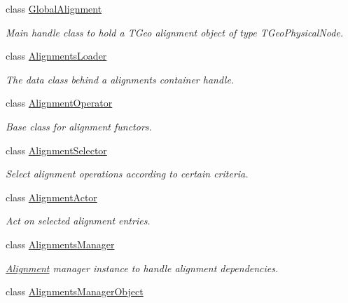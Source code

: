 \begin{DoxyCompactItemize}
class \hyperlink{class_d_d4hep_1_1_alignments_1_1_global_alignment}{GlobalAlignment}
\begin{DoxyCompactList}\small\item\em Main handle class to hold a TGeo alignment object of type TGeoPhysicalNode. \item\end{DoxyCompactList}\item 
class \hyperlink{class_d_d4hep_1_1_alignments_1_1_alignments_loader}{AlignmentsLoader}
\begin{DoxyCompactList}\small\item\em The data class behind a alignments container handle. \item\end{DoxyCompactList}\item 
class \hyperlink{class_d_d4hep_1_1_alignments_1_1_alignment_operator}{AlignmentOperator}
\begin{DoxyCompactList}\small\item\em Base class for alignment functors. \item\end{DoxyCompactList}\item 
class \hyperlink{class_d_d4hep_1_1_alignments_1_1_alignment_selector}{AlignmentSelector}
\begin{DoxyCompactList}\small\item\em Select alignment operations according to certain criteria. \item\end{DoxyCompactList}\item 
class \hyperlink{class_d_d4hep_1_1_alignments_1_1_alignment_actor}{AlignmentActor}
\begin{DoxyCompactList}\small\item\em Act on selected alignment entries. \item\end{DoxyCompactList}\item 
class \hyperlink{class_d_d4hep_1_1_alignments_1_1_alignments_manager}{AlignmentsManager}
\begin{DoxyCompactList}\small\item\em \hyperlink{class_d_d4hep_1_1_alignments_1_1_alignment}{Alignment} manager instance to handle alignment dependencies. \item\end{DoxyCompactList}\item 
class \hyperlink{class_d_d4hep_1_1_alignments_1_1_alignments_manager_object}{AlignmentsManagerObject}

\end{DoxyCompactItemize}
